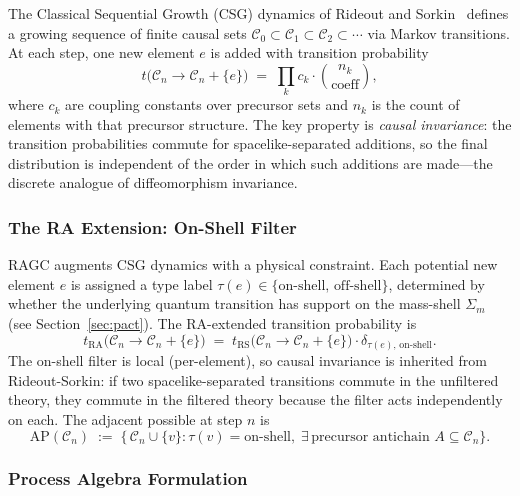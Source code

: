 \documentclass[11pt,a4paper]{article}
\theoremstyle{plain}
\theoremstyle{definition}
\theoremstyle{remark}
\newcommand{\Sigmam}{\Sigma_{m}}
\newcommand{\AP}{\mathrm{AP}}
\begin{document}
The Classical Sequential Growth (CSG) dynamics of Rideout and
Sorkin~\citep{RideoutSorkin2000} defines a growing sequence of finite causal sets
$\mathcal{C}_{0} \subset \mathcal{C}_{1} \subset \mathcal{C}_{2} \subset \cdots$
via Markov transitions. At each step, one new element $e$ is added with transition
probability
\begin{equation}
  t\bigl(\mathcal{C}_{n} \to \mathcal{C}_{n} + \{e\}\bigr)
  \;=\;
  \prod_{k} c_{k} \cdot \binom{n_{k}}{\text{coeff}},
  \label{eq:amplitude}
\end{equation}
where $c_{k}$ are coupling constants over precursor sets and $n_{k}$ is the count
of elements with that precursor structure. The key property is \emph{causal
invariance}: the transition probabilities commute for spacelike-separated
additions, so the final distribution is independent of the order in which such
additions are made---the discrete analogue of diffeomorphism invariance.

\subsubsection{The RA Extension: On-Shell Filter}

RAGC augments CSG dynamics with a physical constraint. Each potential new element
$e$ is assigned a type label $\tau(e) \in \{\text{on-shell},\,\text{off-shell}\}$,
determined by whether the underlying quantum transition has support on the
mass-shell $\Sigmam$ (see Section~\ref{sec:pact}). The RA-extended transition
probability is
\begin{equation}
  t_{\mathrm{RA}}\bigl(\mathcal{C}_{n} \to \mathcal{C}_{n} + \{e\}\bigr)
  \;=\;
  t_{\mathrm{RS}}\bigl(\mathcal{C}_{n} \to \mathcal{C}_{n} + \{e\}\bigr)
  \cdot \delta_{\tau(e),\,\text{on-shell}}.
\end{equation}
The on-shell filter is local (per-element), so causal invariance is inherited from
Rideout-Sorkin: if two spacelike-separated transitions commute in the unfiltered
theory, they commute in the filtered theory because the filter acts independently
on each. The adjacent possible at step $n$ is
\begin{equation}
  \AP(\mathcal{C}_{n})
  \;:=\;
  \bigl\{\, \mathcal{C}_{n} \cup \{v\} :
    \tau(v) = \text{on-shell},\;
    \exists\,\text{precursor antichain } A \subseteq \mathcal{C}_{n}
  \bigr\}.
\end{equation}

\subsubsection{Process Algebra Formulation}
\end{document}
